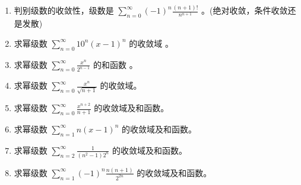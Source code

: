 \documentclass[12pt, a4paper]{article}
\newcommand{\blank}[1]{\underline{\hspace{#1}}}
\begin{document}
\begin{enumerate}
    \item 判别级数的收敛性，级数是 $ \sum_{n=0}^{\infty} (-1)^{n} \frac{(n+1)!}{n^{n+1}} $ \blank{2cm}。(绝对收敛，条件收敛还是发散)

    \item 求幂级数 $ \sum_{n=0}^{\infty} 10^{n}(x-1)^{n} $ 的收敛域 \blank{2cm}。

    \item 求幂级数 $ \sum_{n=0}^{\infty} \frac{x^{n}}{2^{n-1}} $ 的和函数 \blank{2cm}。

    \item 求幂级数 $ \sum_{n=0}^{\infty}\frac{x^{n}}{\sqrt{n+1}} $ 的收敛域。

    \item 求幂级数 $ \sum_{n=0}^{\infty} \frac{x^{n+2}}{n+1} $ 的收敛域及和函数。

    \item 求幂级数 $ \sum_{n=1}^{\infty} n(x-1)^{n} $ 的收敛域及和函数。

    \item 求幂级数 $ \sum_{n=2}^{\infty}\frac{1}{(n^{2}-1)2^{n}} $ 的收敛域及和函数。

    \item 求幂级数 $ \sum_{n=1}^{\infty} (-1)^{n} \frac{n(n+1)}{2^{2n}} $ 的收敛域及和函数。
\end{enumerate}
\end{document}
